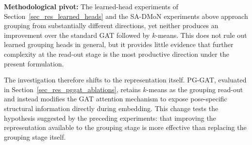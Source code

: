 \textbf{Methodological pivot:}
The learned-head experiments of
Section~\ref{sec_res_learned_heads} and the SA-DMoN experiments above
approach grouping from substantially different directions, yet neither
produces an improvement over the standard GAT followed by $k$-means.
This does not rule out learned grouping heads in general, but it
provides little evidence that further complexity at the read-out stage
is the most productive direction under the present formulation.

The investigation therefore shifts to the representation itself.
PG-GAT, evaluated in Section~\ref{sec_res_pggat_ablations}, retains
$k$-means as the grouping read-out and instead modifies the GAT
attention mechanism to expose pose-specific structural information
directly during embedding. This change tests the hypothesis suggested
by the preceding experiments: that improving the representation
available to the grouping stage is more effective than replacing the
grouping stage itself.
